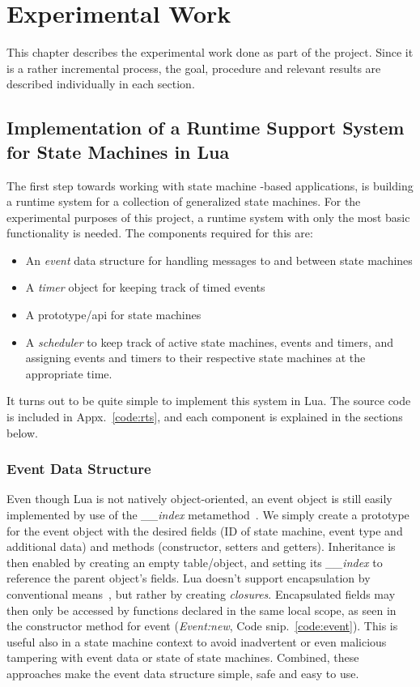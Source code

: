 \chapter{Experimental Work}
\label{ch:experimental_work}
This chapter describes the experimental work done as part of the project. Since it is a rather incremental process, the goal, procedure and relevant results are described individually in each section.

\section{Implementation of a Runtime Support System for State Machines in Lua}
\label{sec:impl_runtime_support}
The first step towards working with state machine -based applications, is building a runtime system for a collection of generalized state machines. For the experimental purposes of this project, a runtime system with only the most basic functionality is needed. The components required for this are:

\begin{itemize}
	\item An \emph{event} data structure for handling messages to and between state machines
	\item A \emph{timer} object for keeping track of timed events
	\item A prototype/\gls{api} for state machines
	\item A \emph{scheduler} to keep track of active state machines, events and timers, and assigning events and timers to their respective state machines at the appropriate time.
\end{itemize}

It turns out to be quite simple to implement this system in Lua. The source code is included in Appx.~\ref{code:rts}, and each component is explained in the sections below.

\subsection{Event Data Structure}
\label{sec:impl_event}
Even though Lua is not natively object-oriented, an event object is still easily implemented by use of the \emph{\_\_index} metamethod~\cite[13.4.1]{book:programming_in_lua_first}. We simply create a prototype for the event object with the desired fields (ID of state machine, event type and additional data) and methods (constructor, setters and getters). Inheritance is then enabled by creating an empty table/object, and setting its \emph{\_\_index} to reference the parent object's fields. Lua doesn't support encapsulation by conventional means~\cite[16.4]{book:programming_in_lua_first}, but rather by creating \emph{closures}. Encapsulated fields may then only be accessed by functions declared in the same local scope, as seen in the constructor method for event (\emph{Event:new}, Code snip.~\ref{code:event}). This is useful also in a state machine context to avoid inadvertent or even malicious tampering with event data or state of state machines. Combined, these approaches make the event data structure simple, safe and easy to use.

